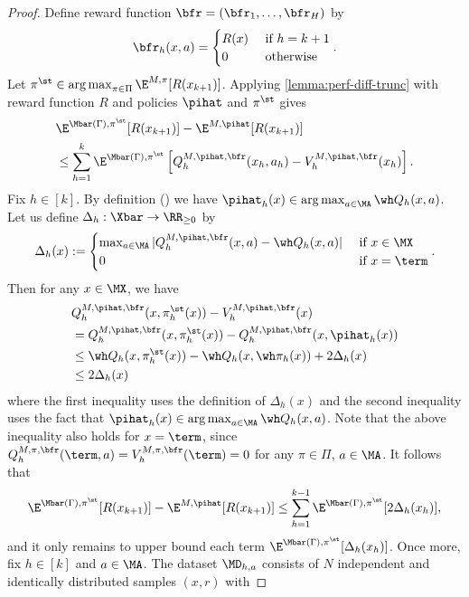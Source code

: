 \begin{proof}
  Define reward function $\bfr = (\bfr_1,\dots,\bfr_H)$ by 
  \[\bfr_h(x,a) = \begin{cases} R(x) & \text{ if } h = k+1 \\ 0 & \text{ otherwise } \end{cases}.\] 
  Let $\pi^\st \in \argmax_{\pi\in\Pi} \E^{M,\pi}[R(x_{k+1})]$. Applying \cref{lemma:perf-diff-trunc} with reward function $R$ and policies $\pihat$ and $\pi^\st$ gives
  \begin{align*}
  &\E^{\Mbar(\Gamma),\pi^\st}[R(x_{k+1})] - \E^{M,\pihat}[R(x_{k+1})] \\
  &\leq \sum_{h=1}^k \E^{\Mbar(\Gamma),\pi^\st} \left[Q^{M,\pihat,\bfr}_h(x_h, a_h) - V^{M,\pihat,\bfr}_h(x_h)\right].
  \end{align*}
Fix $h \in [k]$. By definition () we have $\pihat_h(x) \in \argmax_{a\in\MA} \wh Q_h(x,a)$. Let us define $\Delta_h:\Xbar\to\RR_{\geq 0}$ by \[\Delta_h(x) := \begin{cases} \max_{a \in \MA} | Q^{M,\pihat,\bfr}_h(x,a) - \wh Q_h(x,a)| & \text{ if } x \in \MX \\ 0 & \text{ if } x = \term\end{cases}.\] Then for any $x \in \MX$, we have
  \begin{align*}
    &Q^{M,\pihat,\bfr}_h(x, \pi_h^\st(x)) - V^{M,\pihat,\bfr}_h(x) \\
    &= Q^{M,\pihat,\bfr}_h(x, \pi_h^\st(x)) - Q^{M,\pihat,\bfr}_h(x, \pihat_h(x))  \\
    &\leq \wh Q_h(x,\pi^\st_h(x)) - \wh Q_h(x,\wh\pi_h(x))+ 2\Delta_h(x) \\ 
    &\leq 2\Delta_h(x)
  \end{align*}
  where the first inequality uses the definition of $\Delta_h(x)$ and the second inequality uses the fact that $\pihat_h(x) \in \argmax_{a \in \MA} \wh Q_h(x,a)$. Note that the above inequality also holds for $x=\term$, since $Q^{M,\pi,\bfr}_h(\term,a) = V^{M,\pi,\bfr}_h(\term) = 0$ for any $\pi\in\Pi$, $a \in \MA$. It follows that
  \begin{equation} 
  \E^{\Mbar(\Gamma),\pi^\st}[R(x_{k+1})] - \E^{M,\pihat}[R(x_{k+1})]
  \leq \sum_{h=1}^{k-1} \E^{\Mbar(\Gamma),\pi^\st}[2\Delta_h(x_h)],
  \label{eq:psdp-perf-diff}
  \end{equation}
  and it only remains to upper bound each term $\E^{\Mbar(\Gamma),\pi^\st}[\Delta_h(x_h)]$. Once more, fix $h \in [k]$ and $a \in \MA$. The dataset $\MD_{h,a}$ consists of $N$ independent and identically distributed samples $(x,r)$ with

\end{proof}
